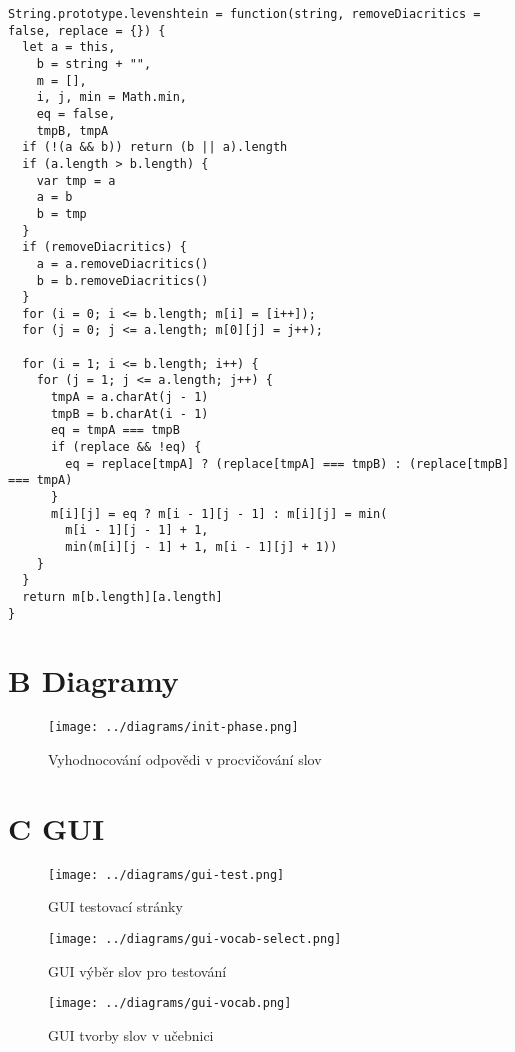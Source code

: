 \documentclass[a4paper,11pt,titlepage,fleqn]{article}
\begin{document}
\begin{lstlisting}[language=JS, caption={Implementace algoritmu pro výpočet Levenshteinovy vzdálenosti},label=code:levenshtein-full]
String.prototype.levenshtein = function(string, removeDiacritics = false, replace = {}) {
  let a = this,
    b = string + "",
    m = [],
    i, j, min = Math.min,
    eq = false,
    tmpB, tmpA
  if (!(a && b)) return (b || a).length
  if (a.length > b.length) {
    var tmp = a
    a = b
    b = tmp
  }
  if (removeDiacritics) {
    a = a.removeDiacritics()
    b = b.removeDiacritics()
  }
  for (i = 0; i <= b.length; m[i] = [i++]);
  for (j = 0; j <= a.length; m[0][j] = j++);

  for (i = 1; i <= b.length; i++) {
    for (j = 1; j <= a.length; j++) {
      tmpA = a.charAt(j - 1)
      tmpB = b.charAt(i - 1)
      eq = tmpA === tmpB
      if (replace && !eq) {
        eq = replace[tmpA] ? (replace[tmpA] === tmpB) : (replace[tmpB] === tmpA)
      }
      m[i][j] = eq ? m[i - 1][j - 1] : m[i][j] = min(
        m[i - 1][j - 1] + 1,
        min(m[i][j - 1] + 1, m[i - 1][j] + 1))
    }
  }
  return m[b.length][a.length]
}
\end{lstlisting}


\section*{B Diagramy}

\begin{figure}[ht!]
    \centering
    \texttt{[image: ../diagrams/init-phase.png]}
    \caption{Vyhodnocování odpovědi v procvičování slov}
\end{figure}

\newpage
\thispagestyle{plain}
\section*{C GUI}
\begin{figure}[ht!]
    \centering
    \texttt{[image: ../diagrams/gui-test.png]}
    \caption{GUI testovací stránky}
\end{figure}


\begin{figure}[ht!]
    \centering
    \texttt{[image: ../diagrams/gui-vocab-select.png]}
    \caption{GUI výběr slov pro testování}
\end{figure}


\begin{figure}[ht!]
    \centering
    \texttt{[image: ../diagrams/gui-vocab.png]}
    \caption{GUI tvorby slov v učebnici}
\end{figure}
\end{document}
